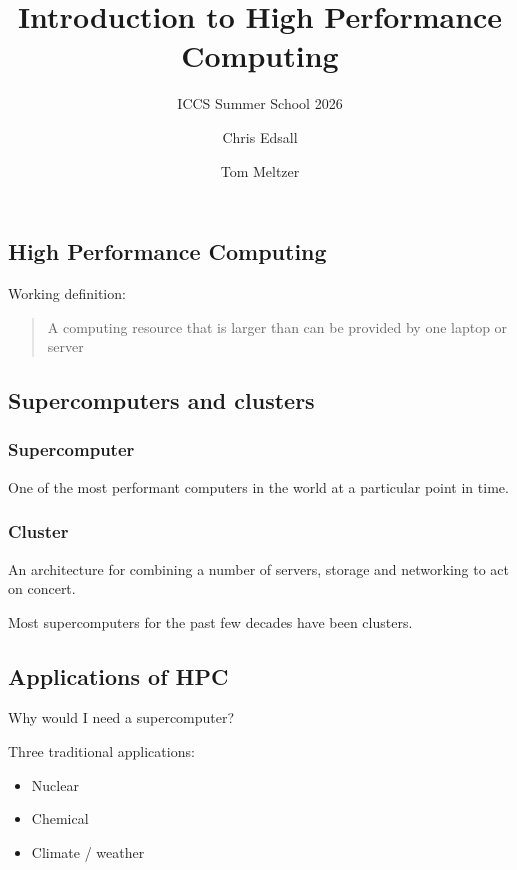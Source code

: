 \documentclass[
  letterpaper,
  DIV=11,
  numbers=noendperiod]{scrartcl}
\title{Introduction to High Performance Computing}
\subtitle{ICCS Summer School 2026}
\author{Chris Edsall \and Tom Meltzer}
\date{}
\providecommand{\tightlist}{%
  \setlength{\itemsep}{0pt}\setlength{\parskip}{0pt}}
\begin{document}
\maketitle


\subsection{High Performance
Computing}\label{high-performance-computing}

Working definition:

\begin{quote}
A computing resource that is larger than can be provided by one laptop
or server
\end{quote}

\subsection{Supercomputers and
clusters}\label{supercomputers-and-clusters}

\subsubsection{Supercomputer}\label{supercomputer}

One of the most performant computers in the world at a particular point
in time.

\subsubsection{Cluster}\label{cluster}

An architecture for combining a number of servers, storage and
networking to act on concert.

Most supercomputers for the past few decades have been clusters.

\subsection{Applications of HPC}\label{applications-of-hpc}

Why would I need a supercomputer?

Three traditional applications:

\begin{itemize}
\tightlist
\item
  Nuclear
\item
  Chemical
\item
  Climate / weather
\end{itemize}
\end{document}
